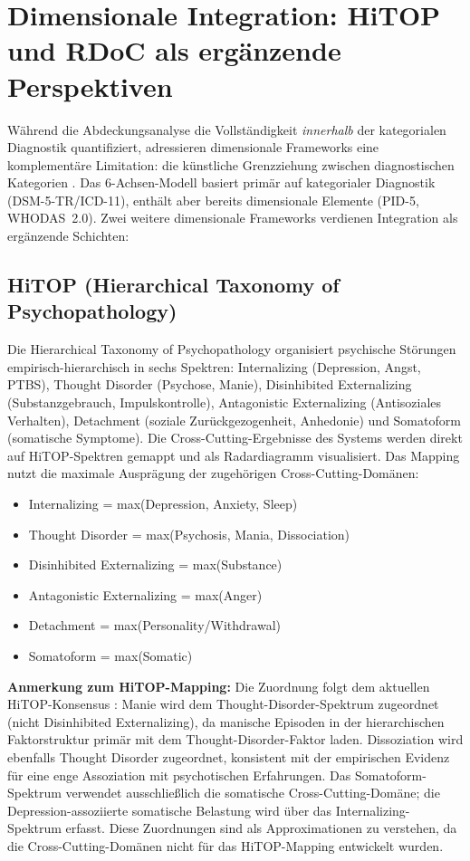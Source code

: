 \documentclass[11pt,a4paper]{article}
\begin{document}
\section{Dimensionale Integration: HiTOP und RDoC als erg\"anzende Perspektiven}
\label{sec:dimensional}

W\"ahrend die Abdeckungsanalyse die Vollst\"andigkeit \textit{innerhalb} der kategorialen Diagnostik quantifiziert, adressieren dimensionale Frameworks eine komplement\"are Limitation: die k\"unstliche Grenzziehung zwischen diagnostischen Kategorien \citep{Rosenman2003}. Das 6-Achsen-Modell basiert prim\"ar auf kategorialer Diagnostik (DSM-5-TR/ICD-11), enth\"alt aber bereits dimensionale Elemente (PID-5, WHODAS~2.0). Zwei weitere dimensionale Frameworks verdienen Integration als erg\"anzende Schichten:

\subsection{HiTOP (Hierarchical Taxonomy of Psychopathology)}

Die Hierarchical Taxonomy of Psychopathology \citep{Kotov2017, Kotov2022, Krueger2018} organisiert psychische St\"orungen empirisch-hierarchisch in sechs Spektren: Internalizing (Depression, Angst, PTBS), Thought Disorder (Psychose, Manie), Disinhibited Externalizing (Substanzgebrauch, Impulskontrolle), Antagonistic Externalizing (Antisoziales Verhalten), Detachment (soziale Zur\"uckgezogenheit, Anhedonie) und Somatoform (somatische Symptome). Die Cross-Cutting-Ergebnisse des Systems werden direkt auf HiTOP-Spektren gemappt und als Radardiagramm visualisiert. Das Mapping nutzt die maximale Auspr\"agung der zugeh\"origen Cross-Cutting-Dom\"anen:

\begin{itemize}[noitemsep]
\item Internalizing = max(Depression, Anxiety, Sleep)
\item Thought Disorder = max(Psychosis, Mania, Dissociation)
\item Disinhibited Externalizing = max(Substance)
\item Antagonistic Externalizing = max(Anger)
\item Detachment = max(Personality/Withdrawal)
\item Somatoform = max(Somatic)
\end{itemize}

\textbf{Anmerkung zum HiTOP-Mapping:} Die Zuordnung folgt dem aktuellen HiTOP-Konsensus \citep{Kotov2021}: Manie wird dem Thought-Disorder-Spektrum zugeordnet (nicht Disinhibited Externalizing), da manische Episoden in der hierarchischen Faktorstruktur prim\"ar mit dem Thought-Disorder-Faktor laden. Dissoziation wird ebenfalls Thought Disorder zugeordnet, konsistent mit der empirischen Evidenz f\"ur eine enge Assoziation mit psychotischen Erfahrungen. Das Somatoform-Spektrum verwendet ausschlie\ss{}lich die somatische Cross-Cutting-Dom\"ane; die Depression-assoziierte somatische Belastung wird \"uber das Internalizing-Spektrum erfasst. Diese Zuordnungen sind als Approximationen zu verstehen, da die Cross-Cutting-Dom\"anen nicht f\"ur das HiTOP-Mapping entwickelt wurden.
\end{document}
